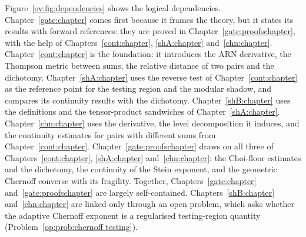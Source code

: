 Figure~\ref{ov:fig:dependencies} shows the logical dependencies. Chapter~\ref{gate:chapter} comes first because it frames the theory, but it states its results with forward references: they are proved in Chapter~\ref{gate:proofschapter}, with the help of Chapters~\ref{cont:chapter}, \ref{shA:chapter} and~\ref{chn:chapter}. Chapter~\ref{cont:chapter} is the foundation: it introduces the ARN derivative, the Thompson metric between sums, the relative distance of two pairs and the dichotomy. Chapter~\ref{shA:chapter} uses the reverse test of Chapter~\ref{cont:chapter} as the reference point for the testing region and the modular shadow, and compares its continuity results with the dichotomy. Chapter~\ref{shB:chapter} uses the definitions and the tensor-product sandwiches of Chapter~\ref{shA:chapter}. Chapter~\ref{chn:chapter} uses the derivative, the level decomposition it induces, and the continuity estimates for pairs with different sums from Chapter~\ref{cont:chapter}. Chapter~\ref{gate:proofschapter} draws on all three of Chapters~\ref{cont:chapter}, \ref{shA:chapter} and~\ref{chn:chapter}: the Choi-floor estimates and the dichotomy, the continuity of the Stein exponent, and the geometric Chernoff converse with its fragility. Together, Chapters~\ref{gate:chapter} and~\ref{gate:proofschapter} are largely self-contained. Chapters~\ref{shB:chapter} and~\ref{chn:chapter} are linked only through an open problem, which asks whether the adaptive Chernoff exponent is a regularised testing-region quantity (Problem~\ref{op:prob:chernoff testing}).


